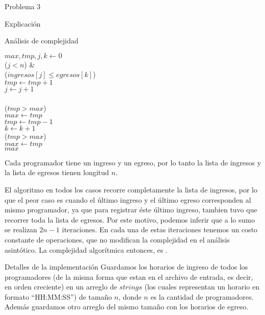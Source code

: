 \begin{section}{Problema 3}
\begin{subsection}{Explicación}
\begin{subsubsection}{Análisis de complejidad}
			\begin{pseudo}
				\tab $max,tmp,j,k \leftarrow 0$ \\
				\tab \WHILE($j< n$) &   \\
				\tab \tab \IF($ingresos[j]\leq egresos[k]$) \\
				\tab \tab \tab $tmp \leftarrow tmp+1$ \\
				\tab \tab \tab $j \leftarrow j+1$ \\
				\tab \tab \ELSE \\
				\tab \tab \tab \IF($tmp>max$) \\
				\tab \tab \tab \tab $max \leftarrow tmp$ \\
				\tab \tab \tab $tmp \leftarrow tmp - 1$ \\
				\tab \tab \tab $k \leftarrow k+1$ \\
				\tab \IF($tmp>max$) \\
				\tab \tab $max \leftarrow tmp$ \\
				\tab \RET $max$
			\end{pseudo}

			Cada programador tiene un ingreso y un egreso, por lo tanto la lista de ingresos y la lista de egresos tienen longitud $n$.

El algoritmo en todos los casos recorre completamente la lista de ingresos, por lo que el peor caso es cuando el último ingreso y el último egreso corresponden al mismo programador, ya que para registrar éste último ingreso, tambien tuvo que recorrer toda la lista de egresos. Por este motivo, podemos inferir que a lo sumo se realizan $2n -1$ iteraciones. En cada una de estas iteraciones tenemos un costo constante de operaciones, que no modifican la complejidad en el análisis asintótico. La complejidad algorítmica entonces, es .

		\end{subsubsection}

	\end{subsection}

	\begin{subsection}{Detalles de la implementación}
	Guardamos los horarios de ingreso de todos los programadores (de la misma forma que estan en el archivo de entrada, es decir, en orden creciente) en un arreglo de $strings$ (los cuales representan un horario en formato ``HH:MM:SS'') de tamaño $n$, donde $n$ es la cantidad de programadores. Además guardamos otro arreglo del mismo tamaño con los horarios de egreso.
	

\end{subsection}
\end{section}
